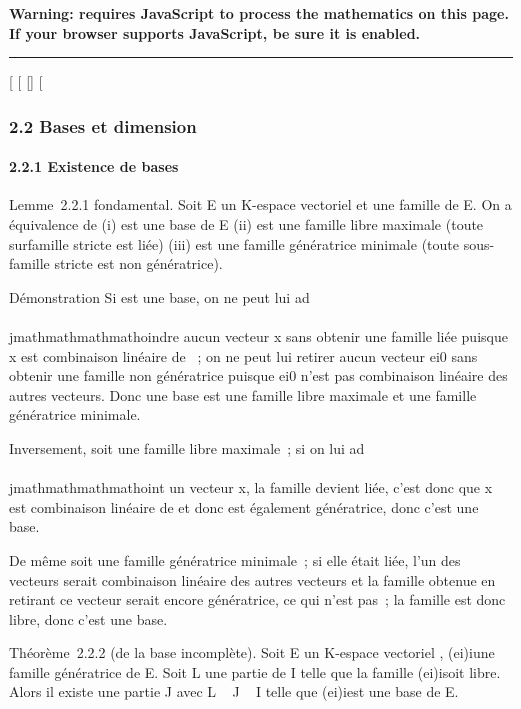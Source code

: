 \textbf{Warning: 
requires JavaScript to process the mathematics on this page.\\ If your
browser supports JavaScript, be sure it is enabled.}

\begin{center}\rule{3in}{0.4pt}\end{center}

{[}
{[}
{[}{]}
{[}

\subsubsection{2.2 Bases et dimension}

\paragraph{2.2.1 Existence de bases}

Lemme~2.2.1 fondamental. Soit E un K-espace vectoriel et  une famille
de E. On a équivalence de (i)  est une base de E (ii)  est une famille
libre maximale (toute surfamille stricte est liée) (iii)  est une
famille génératrice minimale (toute sous-famille stricte est non
génératrice).

Démonstration Si  est une base, on ne peut lui ad\\\\jmathmathmathmathoindre aucun vecteur
x sans obtenir une famille liée puisque x est combinaison linéaire de
~; on ne peut lui retirer aucun vecteur ei0 sans
obtenir une famille non génératrice puisque ei0
n'est pas combinaison linéaire des autres vecteurs. Donc une base est
une famille libre maximale et une famille génératrice minimale.

Inversement, soit  une famille libre maximale~; si on lui ad\\\\jmathmathmathmathoint un
vecteur x, la famille devient liée, c'est donc que x est combinaison
linéaire de  et donc  est également génératrice, donc c'est une base.

De même soit  une famille génératrice minimale~; si elle était liée,
l'un des vecteurs serait combinaison linéaire des autres vecteurs et la
famille obtenue en retirant ce vecteur serait encore génératrice, ce qui
n'est pas~; la famille est donc libre, donc c'est une base.

Théorème~2.2.2 (de la base incomplète). Soit E un K-espace vectoriel ,
(ei)i\inI une famille génératrice de E. Soit L une
partie de I telle que la famille (ei)i\inL soit libre.
Alors il existe une partie J avec L \subset~ J \subset~ I telle que
(ei)i\inJ est une base de E.

